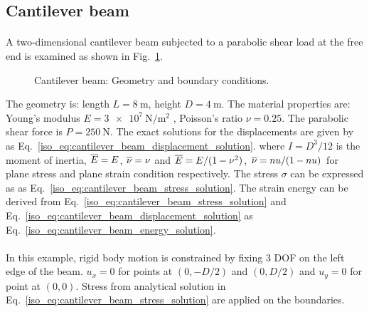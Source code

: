 \subsection{Cantilever beam}
\paragraph{}
A two-dimensional cantilever beam subjected to a parabolic shear load at the free end is examined as shown in Fig.~\ref{qdt_fig:ex_cantilever_beam_geo_bc}.
    \begin{figure}[h!]
    \centering
        \caption{ Cantilever beam: Geometry and boundary conditions.}
        \label{qdt_fig:ex_cantilever_beam_geo_bc}
    \end{figure}
%
The geometry is: length $L=\SI{8}{\meter}$, height $D=\SI{4}{\meter}$.
The material properties are: Young’s modulus $E = \SI{3e7}{\newton \per \square \meter}$ , Poisson’s ratio $ \nu =0.25$.
The parabolic shear force is $P = \SI{250}{\newton}$.
The exact solutions for the displacements are given by \citep{Aug2008} as Eq.~\ref{iso_eq:cantilever_beam_displacement_solution}.
where $I=D^3/12$ is the moment of inertia, $\overline{E}=E$, $\overline{\nu}=\nu$ and $\overline{E}=E/(1-\nu^2)$, $\overline{\nu}=nu/(1-nu)$ for plane stress and plane strain condition respectively.
The stress $\sigma$ can be expressed as \citep{Aug2008} as Eq.~\ref{iso_eq:cantilever_beam_stress_solution}.
The strain energy can be derived from Eq.~\ref{iso_eq:cantilever_beam_stress_solution} and Eq.~\ref{iso_eq:cantilever_beam_displacement_solution} as Eq.~\ref{iso_eq:cantilever_beam_energy_solution}.

\paragraph{}
In this example, rigid body motion is constrained by fixing 3 DOF on the left edge of the beam.
$u_x=0$ for points at $(0,-D/2)$ and $(0,D/2)$ and $u_y =0$ for point at $(0,0)$.
Stress from analytical solution in Eq.~\ref{iso_eq:cantilever_beam_stress_solution} are applied on the boundaries.

